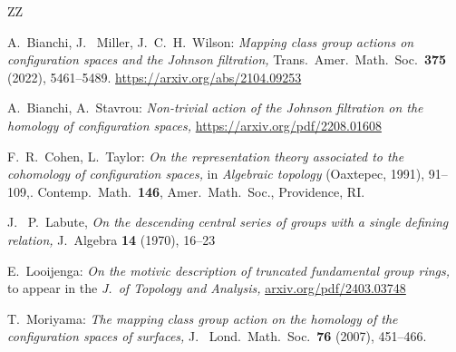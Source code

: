 \documentclass[12pt,letterpaper]{amsart}
\numberwithin{equation}{section}
\theoremstyle{remark}
\begin{document}
\begin{thebibliography}{ZZ}

A.~Bianchi, J.~ Miller, J.~C.~H.~Wilson:
\textit{Mapping class group actions on configuration spaces and the Johnson filtration,}
Trans.\ Amer.\ Math.\ Soc.\  \textbf{375} (2022), 5461--5489.
\url{https://arxiv.org/abs/2104.09253}

A.~Bianchi, A.~Stavrou:
\textit{Non-trivial action of the Johnson filtration on the homology of configuration spaces,}
\url{https://arxiv.org/pdf/2208.01608}

 F.~R.~Cohen, L.~Taylor:
\textit{On the representation theory associated to the cohomology of configuration spaces,} in  \textsl{Algebraic topology} (Oaxtepec, 1991), 91--109,. Contemp.\ Math.\  \textbf{146}, Amer.\ Math.\ Soc., Providence, RI.  

J.~ P.~Labute, 
\textit{On the descending central series of groups with a single defining relation,}
J.~Algebra \textbf{14} (1970), 16--23


E.~Looijenga:
\textit{On the motivic description of truncated fundamental group rings,}
to appear in the \emph{J.\ of Topology and Analysis,} 
\url{arxiv.org/pdf/2403.03748}

T.~Moriyama:
\textit{The mapping class group action on the homology of the configuration spaces of surfaces,}
 J.~ Lond.\ Math.\ Soc.\ \textbf{76} (2007), 451--466. 
 

\end{thebibliography}
\end{document}
